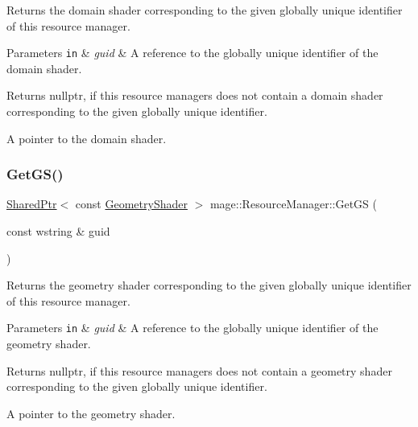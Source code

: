 Returns the domain shader corresponding to the given globally unique identifier of this resource manager.


\begin{DoxyParams}[1]{Parameters}
\mbox{\tt in}  & {\em guid} & A reference to the globally unique identifier of the domain shader. \\
\hline
\end{DoxyParams}
\begin{DoxyReturn}{Returns}
{\ttfamily nullptr}, if this resource managers does not contain a domain shader corresponding to the given globally unique identifier. 

A pointer to the domain shader. 
\end{DoxyReturn}
\hypertarget{classmage_1_1_resource_manager_a66d1b171420e1a3310c6db5db88e3029}{}\label{classmage_1_1_resource_manager_a66d1b171420e1a3310c6db5db88e3029} 
\subsubsection{\texorpdfstring{Get\+G\+S()}{GetGS()}}
{\footnotesize\ttfamily \hyperlink{namespacemage_a1e01ae66713838a7a67d30e44c67703e}{Shared\+Ptr}$<$ const \hyperlink{namespacemage_abb3c4ec904feaa4f076ab736f6bab40f}{Geometry\+Shader} $>$ mage\+::\+Resource\+Manager\+::\+Get\+GS (\begin{DoxyParamCaption}\item[{const wstring \&}]{guid }\end{DoxyParamCaption})\hspace{0.3cm}{\ttfamily [noexcept]}}

Returns the geometry shader corresponding to the given globally unique identifier of this resource manager.


\begin{DoxyParams}[1]{Parameters}
\mbox{\tt in}  & {\em guid} & A reference to the globally unique identifier of the geometry shader. \\
\hline
\end{DoxyParams}
\begin{DoxyReturn}{Returns}
{\ttfamily nullptr}, if this resource managers does not contain a geometry shader corresponding to the given globally unique identifier. 

A pointer to the geometry shader. 
\end{DoxyReturn}
\hypertarget{classmage_1_1_resource_manager_a6b36abca958e92f7a3787598d9c13352}{}\label{classmage_1_1_resource_manager_a6b36abca958e92f7a3787598d9c13352} 
